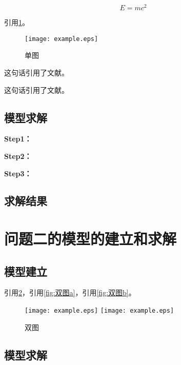 \documentclass[withoutpreface,bwprint]{cumcmthesis}
\begin{document}
\begin{equation}
\label{eq:公式1}
E = mc^2
\end{equation}

引用\cref{fig:单图}。

\begin{figure}[ht]
\centering
\texttt{[image: example.eps]}
\caption{单图}
\label{fig:单图}
\end{figure}

这句话引用了文献\cite{司守奎2011数学建模算法与应用}。

这句话引用了文献。







\subsection{模型求解}

\textbf{Step1：} 

\textbf{Step2：} 

\textbf{Step3：} 

\subsection{求解结果}



\section{问题二的模型的建立和求解}
\subsection{模型建立}

引用\cref{fig:双图}，引用\cref{fig:双图a}，引用\cref{fig:双图b}。

\begin{figure}[ht]
\centering
{}
{\texttt{[image: example.eps]}}
{\texttt{[image: example.eps]}}
\caption{双图}\label{fig:双图}
\end{figure} 

\subsection{模型求解}
\end{document}
